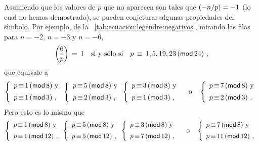 Asumiendo que los valores de $p$ que no aparecen son tales que
$\left({-n}/{p}\right)=-1$ (lo cual no hemos demostrado), se pueden
conjeturar algunas propiedades del s\'{\i}mbolo. Por ejemplo,
de la \tablename~\ref{tab:ecuacion:legendre:negativos}, mirando
las filas para $n=-2$, $n=-3$ y $n=-6$,
\begin{displaymath}
	\legendre 6{p}\,=\,1
	\quad\text{si y s\'olo si}\quad
	p\,\equiv\,1,5,19,23\tmodulo[24]
	\text{ ,}
\end{displaymath}
%
que equivale a
\begin{displaymath}
	\left\{
	\begin{array}{r@{\,\equiv\,}l}
		p & 1\tmodulo[8] \text{ y} \\[5pt]
		p & 1\tmodulo[3] \text{ ,}
	\end{array}\right.%
	\left\{
	\begin{array}{r@{\,\equiv\,}l}
		p & 5\tmodulo[8] \text{ y} \\[5pt]
		p & 2\tmodulo[3] \text{ ,}
	\end{array}\right.%
	\left\{
	\begin{array}{r@{\,\equiv\,}l}
		p & 3\tmodulo[8] \text{ y} \\[5pt]
		p & 1\tmodulo[3] \text{ ,}
	\end{array}\right.\quad\text{o}\quad
	\left\{
	\begin{array}{r@{\,\equiv\,}l}
		p & 7\tmodulo[8] \text{ y} \\[5pt]
		p & 2\tmodulo[3] \text{ .}
	\end{array}\right.
\end{displaymath}
%
Pero esto es lo mismo que
\begin{displaymath}
	\left\{
	\begin{array}{r@{\,\equiv\,}l}
		p & 1\tmodulo[8] \text{ y} \\[5pt]
		p & 1\tmodulo[12] \text{ ,}
	\end{array}\right.%
	\left\{
	\begin{array}{r@{\,\equiv\,}l}
		p & 5\tmodulo[8] \text{ y} \\[5pt]
		p & 5\tmodulo[12] \text{ ,}
	\end{array}\right.%
	\left\{
	\begin{array}{r@{\,\equiv\,}l}
		p & 3\tmodulo[8] \text{ y} \\[5pt]
		p & 7\tmodulo[12] \text{ ,}
	\end{array}\right.\quad\text{o}\quad
	\left\{
	\begin{array}{r@{\,\equiv\,}l}
		p & 7\tmodulo[8] \text{ y} \\[5pt]
		p & 11\tmodulo[12] \text{ ,}
	\end{array}\right.
\end{displaymath}
